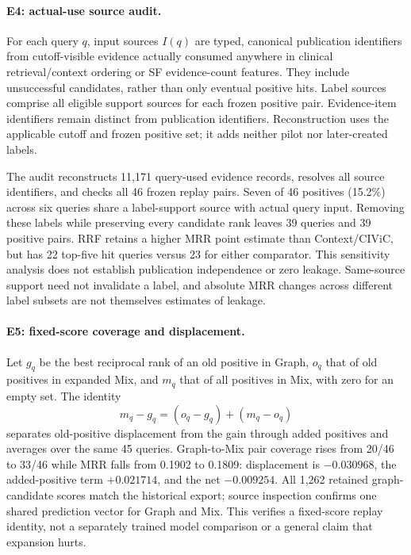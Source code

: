 \documentclass[runningheads]{llncs}
\begin{document}
\paragraph{E4: actual-use source audit.}
For each query \(q\), input sources \(I(q)\) are typed, canonical publication identifiers from cutoff-visible evidence actually consumed anywhere in clinical retrieval/context ordering or SF evidence-count features. They include unsuccessful candidates, rather than only eventual positive hits. Label sources comprise all eligible support sources for each frozen positive pair. Evidence-item identifiers remain distinct from publication identifiers. Reconstruction uses the applicable cutoff and frozen positive set; it adds neither pilot nor later-created labels.

The audit reconstructs 11,171 query-used evidence records, resolves all source identifiers, and checks all 46 frozen replay pairs. Seven of 46 positives (15.2\%) across six queries share a label-support source with actual query input. Removing these labels while preserving every candidate rank leaves 39 queries and 39 positive pairs. RRF retains a higher MRR point estimate than Context/CIViC, but has 22 top-five hit queries versus 23 for either comparator. This sensitivity analysis does not establish publication independence or zero leakage. Same-source support need not invalidate a label, and absolute MRR changes across different label subsets are not themselves estimates of leakage.

\paragraph{E5: fixed-score coverage and displacement.}
Let \(g_q\) be the best reciprocal rank of an old positive in Graph, \(o_q\) that of old positives in expanded Mix, and \(m_q\) that of all positives in Mix, with zero for an empty set. The identity
\[
m_q-g_q=(o_q-g_q)+(m_q-o_q)
\]
separates old-positive displacement from the gain through added positives and averages over the same 45 queries. Graph-to-Mix pair coverage rises from 20/46 to 33/46 while MRR falls from 0.1902 to 0.1809: displacement is \(-0.030968\), the added-positive term \(+0.021714\), and the net \(-0.009254\). All 1,262 retained graph-candidate scores match the historical export; source inspection confirms one shared prediction vector for Graph and Mix. This verifies a fixed-score replay identity, not a separately trained model comparison or a general claim that expansion hurts.
\end{document}
